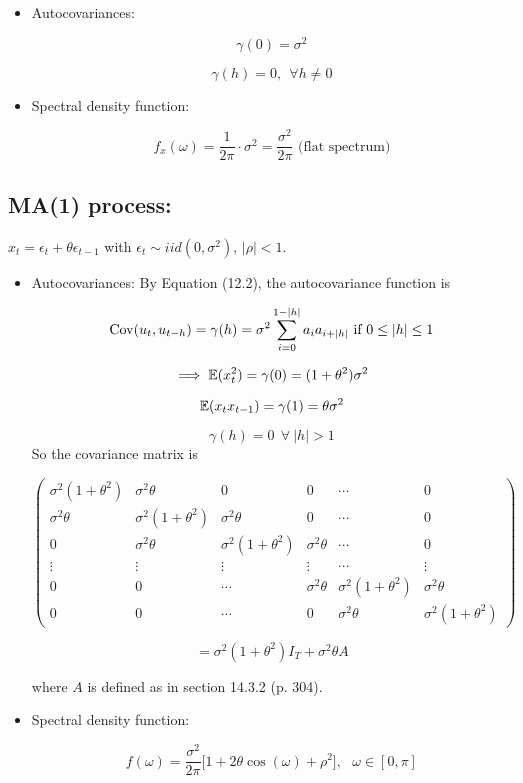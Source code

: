 \begin{itemize}

\item Autocovariances: 

\[
\gamma(0) = \sigma^2
\]

\[
\gamma(h) =0, \ \ \forall h \neq 0
\]

\item Spectral density function:

\[
f_x(\omega) = \frac{1}{2\pi} \cdot \sigma^2 = \frac{\sigma^2}{2 \pi} \text{ (flat spectrum)}
\]

\end{itemize}


\subsection{MA(1) process:} \(x_t = \epsilon_t + \theta \epsilon_{t-1}\) with \(\epsilon_t \sim iid(0, \sigma^2)\), \(|\rho| < 1\). 

\begin{itemize}

\item Autocovariances: By Equation (12.2), the autocovariance function is

\[
\mathrm{Cov}(u_t, u_{t-h})  = \gamma(h) = \sigma^2 \sum_{i=0}^{1 - |h|} a_i a_{i + |h|} \text{ if } 0 \leq |h| \leq 1
\]

\[
\implies \mathbb{E}(x_t^2) = \gamma(0) = (1 + \theta^2)\sigma^2
\]

\[
 \mathbb{E}(x_t x_{t-1}) =  \gamma(1) = \theta \sigma^2
\]

\[
\gamma(h) = 0 \ \ \forall \ |h| > 1
\]
So the covariance matrix is

\[
\begin{pmatrix} 
\sigma^2(1+\theta^2) & \sigma^2\theta & 0 & 0 & \cdots & 0 \\
\sigma^2\theta & \sigma^2(1+\theta^2) & \sigma^2\theta & 0 & \cdots & 0 \\
0 & \sigma^2\theta & \sigma^2(1+\theta^2) & \sigma^2\theta & \cdots & 0 \\
\vdots & \vdots & \vdots & \vdots & \cdots & \vdots \\
 0 & 0& \cdots & \sigma^2\theta  & \sigma^2(1+\theta^2)   & \sigma^2\theta  \\
0 & 0 &  \cdots & 0  & \sigma^2\theta  & \sigma^2(1+\theta^2) 
\end{pmatrix} 
\]

\[
= \sigma^2(1 + \theta^2)I_T + \sigma^2 \theta A
\]

where \(A\) is defined as in section 14.3.2 (p. 304).

\item Spectral density function:

\[
f(\omega) = \frac{\sigma^2}{2\pi} \big[ 1+ 2  \theta \cos( \omega)  + \rho^2  \big] , \ \ \ \omega \in [0, \pi]
 \]

\end{itemize}



